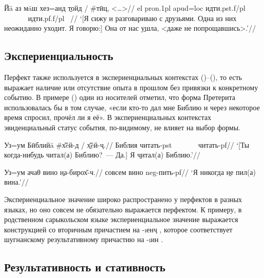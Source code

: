 {{{
\begingl
\gla Йā аз мāш хез=анд \b{тойд} / \#тӣц, <…>//
 {\sc el} {\sc pron.1pl} {\sc apud=loc} идти.{\sc pst.f/pl} ~~~~~~ идти.{\sc pf.f/pl} ~//
\glft ‘[Я сижу и разговариваю с друзьями. Одна из них неожиданно уходит. Я говорю:] Она от нас \b{ушла}, <даже не попрощавшись>.’//
\endgl \xe

\subsection{Экспериенциальность} \label{evid-exper}

Перфект также используется в экспериенциальных контекстах ()–(), то есть выражает наличие или отсутствие опыта в прошлом без привязки к конкретному событию. В примере () один из носителей отметил, что форма Претерита использовалась бы в том случае, «если кто-то дал мне Библию и через некоторое время спросил, прочёл ли я её». В экспериенциальных контекстах эвиденциальный статус события, по-видимому, не влияет на выбор формы.

\begingl
\gla Уз=ум Бӣблийā \#х̌êй-д / \b{х̌êй-ҷ}.//
 Библия читать-{\sc pst} ~~~~~~ читать-{\sc pf}//
\glft ‘[Ты когда-нибудь читал(а) Библию?~— Да.] Я \b{читал(а)} Библию.’//
\endgl \xe

\begingl
\gla Уз=ум ачаθ вино \b{на-бирох̌-ч}.//
 совсем вино {\sc neg}-пить-{\sc pf}//
\glft ‘Я никогда \b{не пил(а)} вина.’//
\endgl \xe

Экспериенциальное значение широко распространено у перфектов в разных языках, но оно совсем не обязательно выражается перфектом. К примеру, в родственном сарыкольском языке экспериенциальное значение выражается конструкцией со вторичным причастием на -\i{енҷ} \parencite[91]{palmer2016}, которое соответствует шугнанскому результативному причастию на -\i{ин} \parencite[371]{edelman1975_tense}.

\subsection{Результативность и стативность} \label{evid-result}

}}}
